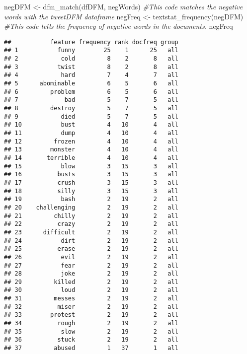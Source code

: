 \documentclass[
]{article}
\newenvironment{Shaded}{\begin{snugshade}}{\end{snugshade}}
\newcommand{\CommentTok}[1]{\textcolor[rgb]{0.56,0.35,0.01}{\textit{#1}}}
\newcommand{\FunctionTok}[1]{\textcolor[rgb]{0.00,0.00,0.00}{#1}}
\newcommand{\NormalTok}[1]{#1}
\newcommand{\OtherTok}[1]{\textcolor[rgb]{0.56,0.35,0.01}{#1}}
\begin{document}
\begin{Shaded}
\begin{Highlighting}[]
\NormalTok{negDFM }\OtherTok{\textless{}{-}} \FunctionTok{dfm\_match}\NormalTok{(dfDFM, negWords)}
\CommentTok{\#This code matches the negative words with the tweetDFM dataframe}
\NormalTok{negFreq }\OtherTok{\textless{}{-}} \FunctionTok{textstat\_frequency}\NormalTok{(negDFM)}
\CommentTok{\#This code tells the frequency of negative words in the documents.}
\NormalTok{negFreq}
\end{Highlighting}
\end{Shaded}

\begin{verbatim}
##           feature frequency rank docfreq group
## 1           funny        25    1      25   all
## 2            cold         8    2       8   all
## 3           twist         8    2       8   all
## 4            hard         7    4       7   all
## 5      abominable         6    5       6   all
## 6         problem         6    5       6   all
## 7             bad         5    7       5   all
## 8         destroy         5    7       5   all
## 9            died         5    7       5   all
## 10           bust         4   10       4   all
## 11           dump         4   10       4   all
## 12         frozen         4   10       4   all
## 13        monster         4   10       4   all
## 14       terrible         4   10       4   all
## 15           blow         3   15       3   all
## 16          busts         3   15       3   all
## 17          crush         3   15       3   all
## 18          silly         3   15       3   all
## 19           bash         2   19       2   all
## 20    challenging         2   19       2   all
## 21         chilly         2   19       2   all
## 22          crazy         2   19       2   all
## 23      difficult         2   19       2   all
## 24           dirt         2   19       2   all
## 25          erase         2   19       2   all
## 26           evil         2   19       2   all
## 27           fear         2   19       2   all
## 28           joke         2   19       2   all
## 29         killed         2   19       2   all
## 30           loud         2   19       2   all
## 31         messes         2   19       2   all
## 32          miser         2   19       2   all
## 33        protest         2   19       2   all
## 34          rough         2   19       2   all
## 35           slow         2   19       2   all
## 36          stuck         2   19       2   all
## 37         abused         1   37       1   all

\end{verbatim}
\end{document}
